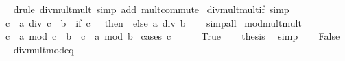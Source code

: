 \begin{isabellebody}
%
\isadelimproof
\ \ %
\endisadelimproof
%
\isatagproof
{}\isamarkupfalse%
\ {\isacharparenleft}{\kern0pt}drule\ div{\isacharunderscore}{\kern0pt}mult{\isacharunderscore}{\kern0pt}mult{}{\isacharparenright}{\kern0pt}\ {\isacharparenleft}{\kern0pt}simp\ add{\isacharcolon}{\kern0pt}\ mult{\isachardot}{\kern0pt}commute{\isacharparenright}{\kern0pt}%
\endisatagproof
{\isafoldproof}%
%
\isadelimproof
\isanewline
%
\endisadelimproof
\isanewline
{}\isamarkupfalse%
\ div{\isacharunderscore}{\kern0pt}mult{\isacharunderscore}{\kern0pt}mult{}{\isacharunderscore}{\kern0pt}if\ {\isacharbrackleft}{\kern0pt}simp{\isacharbrackright}{\kern0pt}{\isacharcolon}{\kern0pt}\isanewline
\ \ {\isachardoublequoteopen}{\isacharparenleft}{\kern0pt}c\ {\isacharasterisk}{\kern0pt}\ a{\isacharparenright}{\kern0pt}\ div\ {\isacharparenleft}{\kern0pt}c\ {\isacharasterisk}{\kern0pt}\ b{\isacharparenright}{\kern0pt}\ {\isacharequal}{\kern0pt}\ {\isacharparenleft}{\kern0pt}if\ c\ {\isacharequal}{\kern0pt}\ {}\ then\ {}\ else\ a\ div\ b{\isacharparenright}{\kern0pt}{\isachardoublequoteclose}\isanewline
%
\isadelimproof
\ \ %
\endisadelimproof
%
\isatagproof
{}\isamarkupfalse%
\ simp{\isacharunderscore}{\kern0pt}all%
\endisatagproof
{\isafoldproof}%
%
\isadelimproof
\isanewline
%
\endisadelimproof
\isanewline
{}\isamarkupfalse%
\ mod{\isacharunderscore}{\kern0pt}mult{\isacharunderscore}{\kern0pt}mult{}{\isacharcolon}{\kern0pt}\isanewline
\ \ {\isachardoublequoteopen}{\isacharparenleft}{\kern0pt}c\ {\isacharasterisk}{\kern0pt}\ a{\isacharparenright}{\kern0pt}\ mod\ {\isacharparenleft}{\kern0pt}c\ {\isacharasterisk}{\kern0pt}\ b{\isacharparenright}{\kern0pt}\ {\isacharequal}{\kern0pt}\ c\ {\isacharasterisk}{\kern0pt}\ {\isacharparenleft}{\kern0pt}a\ mod\ b{\isacharparenright}{\kern0pt}{\isachardoublequoteclose}\isanewline
%
\isadelimproof
%
\endisadelimproof
%
\isatagproof
{}\isamarkupfalse%
\ {\isacharparenleft}{\kern0pt}cases\ {\isachardoublequoteopen}c\ {\isacharequal}{\kern0pt}\ {}{\isachardoublequoteclose}{\isacharparenright}{\kern0pt}\isanewline
\ \ \isamarkupfalse%
\ True\ \isamarkupfalse%
\ \isamarkupfalse%
\ {\isacharquery}{\kern0pt}thesis\ \isamarkupfalse%
\ simp\isanewline
{}\isamarkupfalse%
\isanewline
\ \ \isamarkupfalse%
\ False\isanewline
\ \ \isamarkupfalse%
\ div{\isacharunderscore}{\kern0pt}mult{\isacharunderscore}{\kern0pt}mod{\isacharunderscore}{\kern0pt}eq\isanewline

\end{isabellebody}
